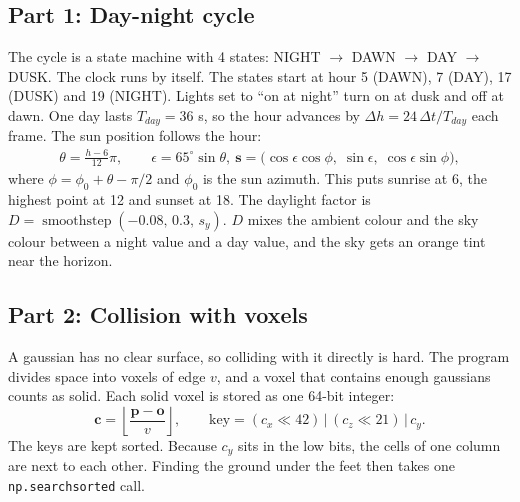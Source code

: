 \documentclass[9pt,twocolumn,a4paper]{extarticle}
\newcommand{\code}[1]{\texttt{#1}}
\begin{document}
\subsection{Part 1: Day-night cycle}
The cycle is a state machine with 4 states: NIGHT $\to$ DAWN $\to$ DAY $\to$ DUSK. The clock runs by itself. The states start at hour 5 (DAWN), 7 (DAY), 17 (DUSK) and 19 (NIGHT). Lights set to ``on at night'' turn on at dusk and off at dawn. One day lasts $T_{day}=36$ s, so the hour advances by $\Delta h = 24\,\Delta t/T_{day}$ each frame. The sun position follows the hour:
\begin{equation}
\begin{gathered}
\theta=\frac{h-6}{12}\pi,\qquad
\epsilon=65^{\circ}\sin\theta,\
\mathbf{s}=\big(\cos\epsilon\cos\phi,\;\sin\epsilon,\;\cos\epsilon\sin\phi\big),
\end{gathered}
\label{eq:sun}
\end{equation}
where $\phi=\phi_0+\theta-\pi/2$ and $\phi_0$ is the sun azimuth. This puts sunrise at 6, the highest point at 12 and sunset at 18. The daylight factor is $D=\operatorname{smoothstep}(-0.08,\,0.3,\,s_y)$. $D$ mixes the ambient colour and the sky colour between a night value and a day value, and the sky gets an orange tint near the horizon.

\par\noindent{}\par\vspace{3pt}

\subsection{Part 2: Collision with voxels}
A gaussian has no clear surface, so colliding with it directly is hard. The program divides space into voxels of edge $v$, and a voxel that contains enough gaussians counts as solid. Each solid voxel is stored as one 64-bit integer:
\begin{equation}
\mathbf{c} = \left\lfloor \frac{\mathbf{p}-\mathbf{o}}{v} \right\rfloor,
\qquad
\text{key} = (c_x \ll 42)\,|\,(c_z \ll 21)\,|\,c_y.
\label{eq:voxel}
\end{equation}
The keys are kept sorted. Because $c_y$ sits in the low bits, the cells of one column are next to each other. Finding the ground under the feet then takes one \code{np.searchsorted} call.

\par\noindent{}\par\vspace{3pt}
\end{document}
